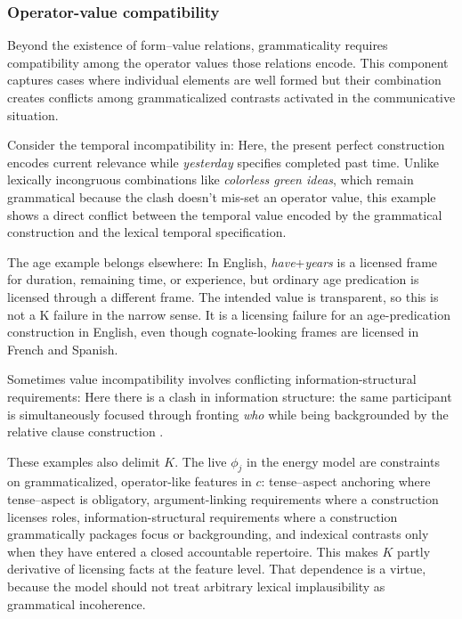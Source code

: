 \documentclass[12pt,letterpaper]{article}
\newcommand{\mention}[1]{\textit{#1}}
\begin{document}
\subsubsection{Operator-value compatibility}\label{sec:value-compatibility}

Beyond the existence of form--value relations, grammaticality requires compatibility among the operator values those relations encode. This component captures cases where individual elements are well formed but their combination creates conflicts among grammaticalized contrasts activated in the communicative situation.

Consider the temporal incompatibility in:
\ea[*]{\mention{I've finished it yesterday.}}\label{ex:tense-sem}
\z
Here, the present perfect construction encodes current relevance while \mention{yesterday} specifies completed past time. Unlike lexically incongruous combinations like \mention{colorless green ideas}, which remain grammatical because the clash doesn't mis-set an operator value, this example shows a direct conflict between the temporal value encoded by the grammatical construction and the lexical temporal specification.

The age example belongs elsewhere:
\label{ex:have-years-sem}
\z
In English, \mention{have}+\mention{years} is a licensed frame for duration, remaining time, or experience, but ordinary age predication is licensed through a different frame. The intended value is transparent, so this is not a K failure in the narrow sense. It is a licensing failure for an age-predication construction in English, even though cognate-looking frames are licensed in French and Spanish.

Sometimes value incompatibility involves conflicting information-structural requirements:
\z
Here there is a clash in information structure: the same participant is simultaneously focused through fronting \mention{who} while being backgrounded by the relative clause construction \autocite{cuneogoldberg2023}.

These examples also delimit $K$. The live $\phi_j$ in the energy model are constraints on grammaticalized, operator-like features in $c$: tense--aspect anchoring where tense--aspect is obligatory, argument-linking requirements where a construction licenses roles, information-structural requirements where a construction grammatically packages focus or backgrounding, and indexical contrasts only when they have entered a closed accountable repertoire. This makes $K$ partly derivative of licensing facts at the feature level. That dependence is a virtue, because the model should not treat arbitrary lexical implausibility as grammatical incoherence.
\end{document}
